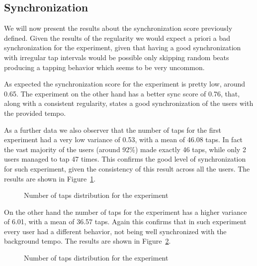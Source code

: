 \subsection{Synchronization}
We will now present the results about the synchronization score previously defined. Given the results of the regularity we would expect a priori a bad synchronization for the \testsecond experiment, given that having a good synchronization with irregular tap intervals would be possible only skipping random beats producing a tapping behavior which seems to be very uncommon.

As expected the synchronization score for the \testsecond experiment is pretty low, around 0.65. The \testfirst experiment on the other hand has a better sync score of 0.76, that, along with a consistent regularity, states a good synchronization of the users with the provided tempo.

As a further data we also observer that the number of taps for the first experiment had a very low variance of 0.53, with a mean of 46.08 taps. In fact the vast majority of the users (around 92\%) made exactly 46 taps, while only 2 users managed to tap 47 times. This confirms the good level of synchronization for such experiment, given the consistency of this result across all the users. The results are shown in Figure~\ref{fig:taps1}.

\begin{figure}[h!t]
\centering
	{\setlength{\fboxsep}{1.5pt}
	 }
\caption{Number of taps distribution for the \testfirst experiment}
\label{fig:taps1}
\end{figure}

On the other hand the number of taps for the \testsecond experiment has a higher variance of 6.01, with a mean of 36.57 taps. Again this confirms that in such experiment every user had a different behavior, not being well synchronized with the background tempo. The results are shown in Figure~\ref{fig:taps2}.

\begin{figure}[h!t]
\centering
	{\setlength{\fboxsep}{1.5pt}
	 }
\caption{Number of taps distribution for the \testsecond experiment}
\label{fig:taps2}
\end{figure}

